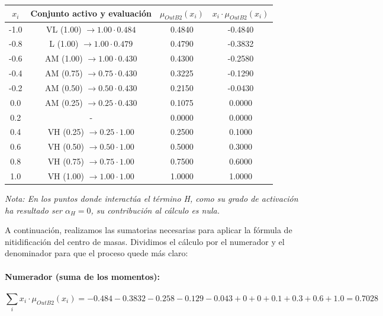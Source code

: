 \documentclass[11pt, a4paper]{article}
\newenvironment{problem}[1][Cuestión]{
	\vspace{0.5cm}
	\noindent{\Large\bfseries #1} \par\vspace{0.5cm}
}{
	\vspace{0.5cm}
}
\begin{document}
\begin{problem}[Cuestión 3 (20 \%)]
{			\begin{table}[H]
				\centering
				\color{blue}
				\begin{tabular}{c c c c}
					\toprule
					\textbf{$x_i$} & \textbf{Conjunto activo y evaluación} & \textbf{$\mu_{OutB2}(x_i)$} & \textbf{$x_i \cdot \mu_{OutB2}(x_i)$} \\
					\midrule
					-1.0 & VL (1.00) $\rightarrow 1.00 \cdot 0.484$ & 0.4840 & -0.4840 \\
					-0.8 & L (1.00) $\rightarrow 1.00 \cdot 0.479$ & 0.4790 & -0.3832 \\
					-0.6 & AM (1.00) $\rightarrow 1.00 \cdot 0.430$ & 0.4300 & -0.2580 \\
					-0.4 & AM (0.75) $\rightarrow 0.75 \cdot 0.430$ & 0.3225 & -0.1290 \\
					-0.2 & AM (0.50) $\rightarrow 0.50 \cdot 0.430$ & 0.2150 & -0.0430 \\
					 0.0 & AM (0.25) $\rightarrow 0.25 \cdot 0.430$ & 0.1075 &  0.0000 \\
					 0.2 & - & 0.0000 &  0.0000 \\
					 0.4 & VH (0.25) $\rightarrow 0.25 \cdot 1.00$ & 0.2500 &  0.1000 \\
					 0.6 & VH (0.50) $\rightarrow 0.50 \cdot 1.00$ & 0.5000 &  0.3000 \\
					 0.8 & VH (0.75) $\rightarrow 0.75 \cdot 1.00$ & 0.7500 &  0.6000 \\
					 1.0 & VH (1.00) $\rightarrow 1.00 \cdot 1.00$ & 1.0000 &  1.0000 \\
					\bottomrule
				\end{tabular}
			\end{table}

			\textit{Nota: En los puntos donde interactúa el término H, como su grado de activación ha resultado ser $\alpha_{H} = 0$, su contribución al cálculo es nula.}

			A continuación, realizamos las sumatorias necesarias para aplicar la fórmula de nitidificación del centro de masas. Dividimos el cálculo por el numerador y el denominador para que el proceso quede más claro:

			\paragraph{Numerador (suma de los momentos):}
			\[
			\sum_{i} x_i \cdot \mu_{OutB2}(x_i) = -0.484 - 0.3832 - 0.258 - 0.129 - 0.043 + 0 + 0 + 0.1 + 0.3 + 0.6 + 1.0 = \mathbf{0.7028}
			\]

}
\end{problem}
\end{document}
